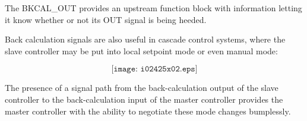 
The BKCAL\_OUT provides an upstream function block with information letting it know whether or not its OUT signal is being heeded.

\vskip 10pt

Back calculation signals are also useful in cascade control systems, where the slave controller may be put into local setpoint mode or even manual mode:

$$\texttt{[image: i02425x02.eps]}$$

The presence of a signal path from the back-calculation output of the slave controller to the back-calculation input of the master controller provides the master controller with the ability to negotiate these mode changes bumplessly.




